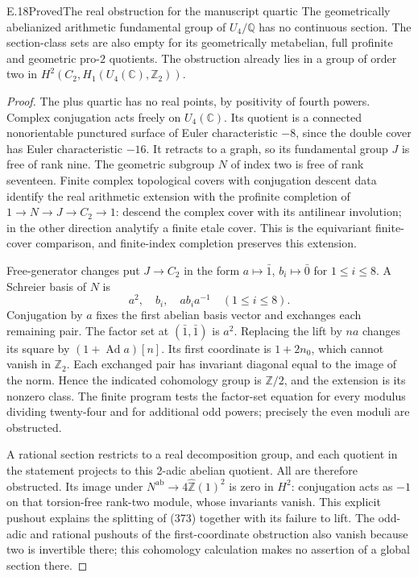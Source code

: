 \begin{statement}{E.18}{Proved}{The real obstruction for the manuscript quartic}
The geometrically abelianized arithmetic fundamental
group of $U_4/\mathbb Q$ has no continuous section.
The section-class sets are also empty for its
geometrically metabelian, full profinite and
geometric pro-$2$ quotients. The obstruction
already lies in a group of order two in
$H^2(C_2,H_1(U_4(\mathbb C),\mathbb Z_2))$.
\end{statement}
\begin{proof}
The plus quartic has no real points, by positivity
of fourth powers. Complex conjugation acts freely
on $U_4(\mathbb C)$. Its quotient is a connected
nonorientable punctured surface of Euler
characteristic $-8$, since the double cover has
Euler characteristic $-16$. It retracts to a
graph, so its fundamental group $J$ is free of
rank nine. The geometric subgroup $N$ of index
two is free of rank seventeen. Finite complex
topological covers with conjugation descent
data identify the real arithmetic extension
with the profinite completion of
$1\to N\to J\to C_2\to1$: descend the complex
cover with its antilinear involution; in the
other direction analytify a finite etale cover.
This is the equivariant finite-cover comparison,
and finite-index completion preserves this
extension.

Free-generator changes put $J\to C_2$ in the
form $a\mapsto\bar1$, $b_i\mapsto\bar0$
for $1\leq i\leq8$. A Schreier basis of $N$ is
\[
 a^2,\quad b_i,\quad ab_i a^{-1}
 \quad(1\leq i\leq8).
\]
Conjugation by $a$ fixes the first abelian basis
vector and exchanges each remaining pair. The
factor set at $(\bar1,\bar1)$ is $a^2$.
Replacing the lift by $na$ changes its square
by $(1+\operatorname{Ad}a)[n]$. Its first
coordinate is $1+2n_0$, which cannot vanish
in $\mathbb Z_2$. Each exchanged pair has
invariant diagonal equal to the image of
the norm. Hence the indicated cohomology
group is $\mathbb Z/2$, and the extension
is its nonzero class. The finite program
tests the factor-set equation for every
modulus dividing twenty-four and for
additional odd powers; precisely the
even moduli are obstructed.

A rational section restricts to a real
decomposition group, and each quotient
in the statement projects to this 2-adic
abelian quotient. All are therefore
obstructed. Its image under
$N^{\mathrm{ab}}\to4\widehat{\mathbb Z}(1)^2$
is zero in $H^2$: conjugation acts as
$-1$ on that torsion-free rank-two module,
whose invariants vanish. This explicit
pushout explains the splitting of (373)
together with its failure to lift.
The odd-adic and rational pushouts of
the first-coordinate obstruction also
vanish because two is invertible there;
this cohomology calculation makes no
assertion of a global section there.
\end{proof}


